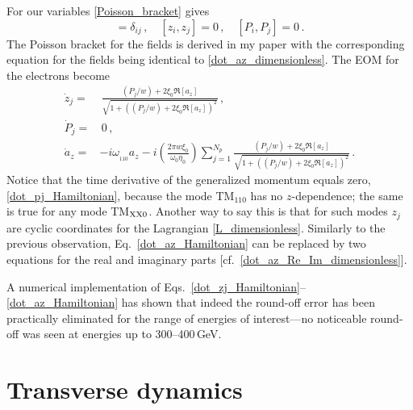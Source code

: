 \documentclass[11pt]{article}
\begin{document}
For our variables \eqref{Poisson_bracket} gives
%
\begin{equation}
[z_i,P_j] = \delta_{ij}\, , \quad [z_i,z_j] = 0\, , \quad [P_i,P_j] = 0\,. %
\label{Poisson_pq}
\end{equation}
%
The Poisson bracket for the fields is derived in my paper \cite{evstatiev_relativistic_2005}
with the corresponding equation for the fields being identical to \eqref{dot_az_dimensionless}.
The EOM for the electrons become
%
\begin{align}
\dot{z}_j =&\, \frac{(P_j/w) + 2\xi_0\Re[a_z]}{\sqrt{1 + \left(({P_j}/{w}) + 2\xi_0\Re[a_z] \right)^2}}\, ,
\label{dot_zj_Hamiltonian} \\
\dot{P}_j =&\, 0\, , \label{dot_pj_Hamiltonian} \\
\dot{a}_z =& -i\omega_{_{110}}a_z - i\left(\frac{2\pi w\xi_0}{\omega_0\eta_0}\right) \sum_{j=1}^{N_p} \frac{(P_j/w) + 2\xi_0\Re[a_z]}{\sqrt{1 + \left(({P_j}/{w}) + 2\xi_0\Re[a_z] \right)^2}} \, .
\label{dot_az_Hamiltonian}
\end{align}
%
Notice that the time derivative of the generalized momentum equals zero, \eqref{dot_pj_Hamiltonian},
because the mode TM$_{110}$ has no $z$-dependence; the same is true for any mode TM$_{\rm XX0}$.
Another way to say this is that for such modes $z_j$ are cyclic coordinates for the Lagrangian 
\eqref{L_dimensionless}. Similarly to the previous observation, Eq.~\eqref{dot_az_Hamiltonian}
can be replaced by two equations for the real and imaginary parts [cf.~\eqref{dot_az_Re_Im_dimensionless}].


A numerical implementation of Eqs.~\eqref{dot_zj_Hamiltonian}--\eqref{dot_az_Hamiltonian} has shown
that indeed the round-off error has been practically eliminated for the range of energies of 
interest---no noticeable round-off was seen at energies up to 300--400\,GeV.



\section{Transverse dynamics}
\label{Transverse_dynamics}
\end{document}
